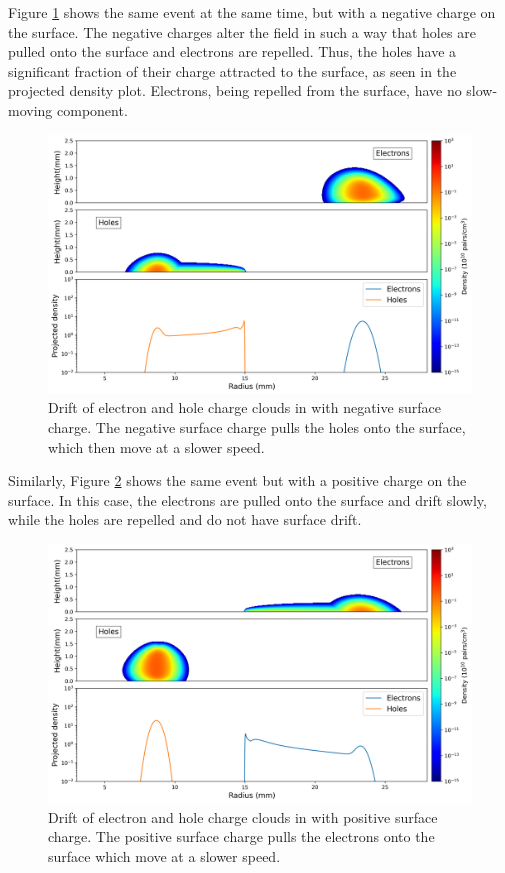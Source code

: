 Figure \ref{ch3_fig_ehd_path_pd_sc_neg_0p3} shows the same event at the same time, but with a negative charge on the surface. The negative charges alter the field in such a way that holes are pulled onto the surface and electrons are repelled. Thus, the holes have a significant fraction of their charge attracted to the surface, as seen in the projected density plot. Electrons, being repelled from the surface, have no slow-moving component.


\begin{figure}%
    \includegraphics[trim={0cm 0 0cm 0},clip,width=0.99\linewidth]{ch3/figs/drift_path_sc=-0.3.png}
    \caption{Drift of electron and hole charge clouds in {\ehd} with negative surface charge. The negative surface charge pulls the holes onto the surface, which then move at a slower speed.}
    \label{ch3_fig_ehd_path_pd_sc_neg_0p3}
\end{figure}

Similarly, Figure \ref{ch3_fig_ehd_path_pd_sc_pos_0p3} shows the same event but with a positive charge on the surface. In this case, the electrons are pulled onto the surface and drift slowly, while the holes are repelled and do not have surface drift. 

\begin{figure}%
    \includegraphics[trim={0cm 0 0cm 0},clip,width=0.99\linewidth]{ch3/figs/drift_path_sc=0.3.png}
    \caption{Drift of electron and hole charge clouds in {\ehd} with positive surface charge. The positive surface charge pulls the electrons onto the surface which move at a slower speed.}
    \label{ch3_fig_ehd_path_pd_sc_pos_0p3}
\end{figure}



